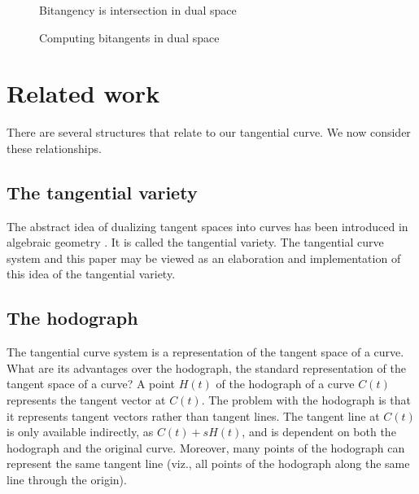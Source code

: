 \documentclass[12pt]{article}
\begin{document}
\begin{figure}[h]
\centerline{}
\caption{Bitangency is intersection in dual space}
\label{fig:biTang}
\end{figure}

\begin{figure*}[h]
\centerline{}
\caption{Computing bitangents in dual space}
\label{fig:eg1}
\end{figure*}


\section{Related work}
\label{sec:comparison}

There are several structures that relate to our tangential curve.
We now consider these relationships.


\subsection{The tangential variety}

The abstract idea of dualizing tangent spaces into curves
has been introduced in algebraic geometry \cite[p. 54]{hartshorne77}.
It is called the tangential variety.
The tangential curve system and this paper may be viewed as an elaboration
and implementation of this idea of the tangential variety.


\subsection{The hodograph}
\label{sec:hodo}

The tangential curve system is a representation of the tangent space of a curve.
What are its advantages over the hodograph, the standard representation of 
the tangent space of a curve?
A point $H(t)$ of the hodograph of a curve $C(t)$ represents the tangent 
vector at $C(t)$.
The problem with the hodograph is that it represents tangent vectors rather
than tangent lines.
The tangent line at $C(t)$ is only available indirectly, as $C(t) + sH(t)$,
and is dependent on both the hodograph and the original curve.
Moreover, many points of the hodograph can represent the same 
tangent line (viz., all points of the hodograph along the same line through the origin).
\end{document}
